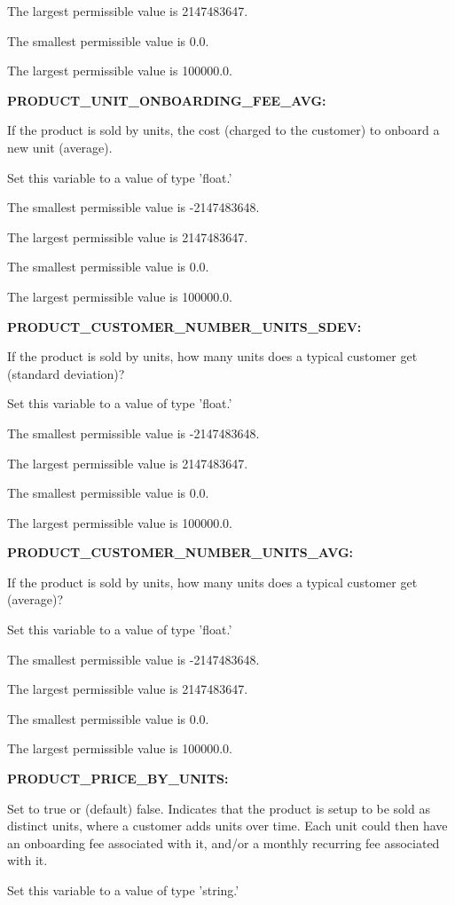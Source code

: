 The largest permissible value is 2147483647.

The smallest permissible value is 0.0.

The largest permissible value is 100000.0.


\textbf{PRODUCT\_UNIT\_ONBOARDING\_FEE\_AVG:}


If the product is sold by units, the cost (charged to the customer) to onboard a new unit (average).

Set this variable to a value of type 'float.'

The smallest permissible value is -2147483648.

The largest permissible value is 2147483647.

The smallest permissible value is 0.0.

The largest permissible value is 100000.0.


\textbf{PRODUCT\_CUSTOMER\_NUMBER\_UNITS\_SDEV:}


If the product is sold by units, how many units does a typical customer get (standard deviation)?

Set this variable to a value of type 'float.'

The smallest permissible value is -2147483648.

The largest permissible value is 2147483647.

The smallest permissible value is 0.0.

The largest permissible value is 100000.0.


\textbf{PRODUCT\_CUSTOMER\_NUMBER\_UNITS\_AVG:}


If the product is sold by units, how many units does a typical customer get (average)?

Set this variable to a value of type 'float.'

The smallest permissible value is -2147483648.

The largest permissible value is 2147483647.

The smallest permissible value is 0.0.

The largest permissible value is 100000.0.


\textbf{PRODUCT\_PRICE\_BY\_UNITS:}


Set to true or (default) false.  Indicates that the product is setup to be sold as distinct units, where a customer adds units over time.  Each unit could then have an onboarding fee associated with it, and/or a monthly recurring fee associated with it.

Set this variable to a value of type 'string.'

